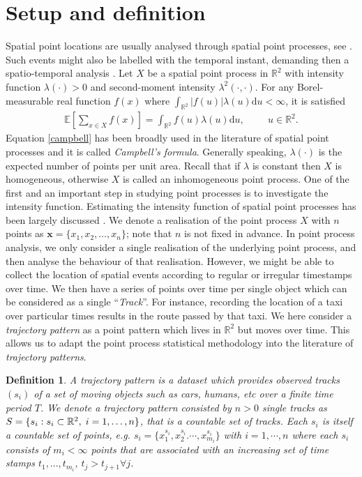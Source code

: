 \documentclass[article]{jss}
\newcommand{\R}{\mathbb{R}}
\newcommand{\ee}{\mathbb{E}}
\newcommand{\de}{\mathrm{d}}
\newtheorem{definition}{Definition}[section]
\begin{document}
\section{Setup and definition}\label{sec:setdef}
Spatial point locations are usually analysed through spatial point processes, see \citep{MW03,daley07,BRT15}. Such events might also be labelled with the temporal instant, demanding then a spatio-temporal analysis \citep{D13}. Let $X$ be a spatial point process in $\mathbb{R}^2$ with intensity function $\lambda(\cdot) >0$ and second-moment intensity $\lambda^2(\cdot,\cdot)$. For any Borel-measurable real function $f(x)$ where $\int_{\R^2} |f(u)|\lambda(u) \de u < \infty$, it is satisfied
\begin{eqnarray}\label{campbell}
\ee \left[\sum\limits_{x \in X} f(x)\right]=\int_{\R^2} f(u)\lambda(u) \de u, \hspace{1cm} u \in \R^2.
\end{eqnarray}
Equation \eqref{campbell} has been broadly used in the literature of spatial point processes and it is called \textit{Campbell's formula}. Generally speaking, $\lambda(\cdot) $ is the expected number of points per unit area. Recall that if $\lambda$ is constant then $X$ is homogeneous, otherwise $X$ is called an inhomogeneous point process. One of the first and an important step in studying point processes is to investigate the intensity function. Estimating the intensity function of spatial point processes has been largely discussed \citep{D85,jones93,CSKWM13}. We denote a realisation of the point process $X$ with $n$ points as $\mathbf{x}=\{x_1,x_2,\ldots,x_n \}$; note that $n$ is not fixed in advance. 
In point process analysis, we only consider a single realisation of the underlying point process, and then analyse the behaviour of that realisation. However, we might be able to collect the location of spatial events according to regular or irregular timestamps over time. We then have a series of points over time per single object which can be considered as a single ``\textit{Track}''. For instance,  recording the location of a taxi over particular times results in the route passed by that taxi. We here consider a \textit{trajectory pattern} as a point pattern which lives in $\R^2$ but moves over time. This allows us to adapt the point process statistical methodology into the literature of \textit{trajectory patterns}.
  \begin{definition}
A \textit{trajectory pattern} is a dataset which provides observed 
tracks $(s_i)$ of a set of moving objects such as cars, humans, etc over a finite time period $T$. We denote a trajectory pattern consisted by $n>0$ single tracks as $S=\{s_i: s_i \subset \R^2, \hspace{1mm} i=1,\ldots,n  \}$, that is a countable set of tracks. Each $s_i$ is itself a countable set of points, e.g. $s_i=\{x_1^{s_i},x_2^{s_i}.\cdots, x_{m_i}^{s_i} \}$ with $i=1,\cdots,n$ where each $s_i$ consists of $m_i<\infty$ points that are associated with an increasing set of time stamps $t_1,...,t_{m_i}$, $t_j > t_{j+1} \forall j$.
\end{definition}
\end{document}
